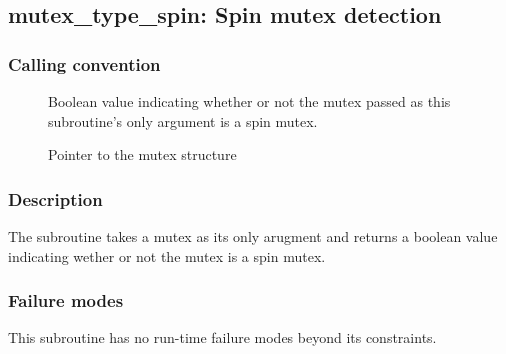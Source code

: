 \clearpage
{}
{}
\label{subr:mutex_type_spin}
\subsection*{mutex\_type\_spin: Spin mutex detection}

\subsubsection*{Calling convention}

\begin{description}
\item[] Boolean value indicating whether or not the
  mutex passed as this subroutine's only argument is a spin mutex.
\item[] Pointer to the mutex structure
\end{description}

\subsubsection*{Description}

The  subroutine takes a mutex as its only
arugment and returns a boolean value indicating wether or not the
mutex is a spin mutex.

\subsubsection*{Failure modes}

This subroutine has no run-time failure modes beyond its constraints.

